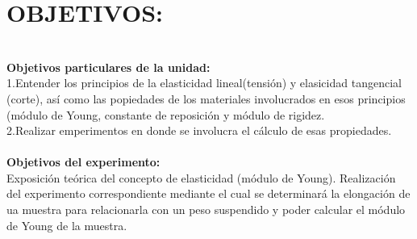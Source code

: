 \documentclass[11pt,a4paper]{article}
\author{Flores Rodguez Jaziel David }
\begin{document}
\section*{OBJETIVOS:}
\medskip
\medskip
\\
\textbf{Objetivos particulares de la unidad:}\\
1.Entender los principios de la elasticidad lineal(tensi\'{o}n) y elasicidad tangencial (corte), as\'{i} como las popiedades de los materiales involucrados en esos principios (m\'{o}dulo de Young, constante de reposici\'{o}n y m\'{o}dulo de rigidez.\\
2.Realizar emperimentos en donde se involucra el c\'{a}lculo de esas propiedades.\\
\medskip
\\
\textbf{Objetivos del experimento:} 
\\Exposici\'{o}n te\'{o}rica del concepto de elasticidad (m\'{o}dulo de Young). Realizaci\'{o}n del experimento correspondiente mediante el cual se determinar\'{a} la elongaci\'{o}n de ua muestra para relacionarla con un peso suspendido y poder calcular el m\'{o}dulo de Young de la muestra. 
\end{document}
